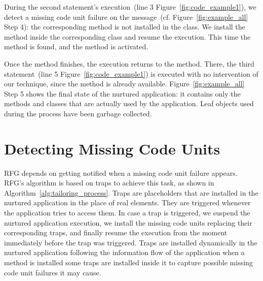 During the second statement's execution~(line 3 Figure~\ref{fig:code_example1}), we detect a missing code unit failure on the  message~(cf. Figure~\ref{fig:example_all} Step 4): the corresponding method is not installed in the  class. We install the method inside the corresponding class and resume the execution. This time the method is found, and the  method is activated.



Once the  method finishes, the execution returns to the  method. There, the third statement~(line 5 Figure~\ref{fig:code_example1}) is executed with no intervention of our technique, since the  method is already available. Figure~\ref{fig:example_all} Step 5 shows the final state of the nurtured application: it contains only the methods and classes that are actually used by the application. Leaf objects used during the process have been garbage collected.


\section{Detecting Missing Code Units}\label{sec:model_detail}


RFG depends on getting notified when a missing code unit failure appears. RFG's algorithm is based on traps to achieve this task, as shown in Algorithm~\ref{alg:tailoring_process}. Traps are placeholders that are installed in the nurtured application in the place of real elements. They are triggered whenever the application tries to access them. In case a trap is triggered, we suspend the nurtured application execution, we install the missing code units replacing their corresponding traps, and finally resume the execution from the moment immediately before the trap was triggered. Traps are installed dynamically in the nurtured application following the information flow of the application \eg when a method  is installed some traps are installed inside it to capture possible missing code unit failures it may cause.

